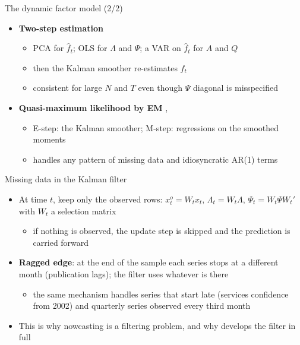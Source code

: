 \begin{frame}{The dynamic factor model (2/2)}
\itemsize{\small}
\begin{itemize}
    \item \textbf{Two-step estimation} 
    \begin{itemize}
        \item PCA for $\hat f_t$; OLS for $\Lambda$ and $\Psi$; a VAR on $\hat f_t$ for $A$ and $Q$
        \item then the Kalman smoother re-estimates $f_t$
        \item consistent for large $N$ and $T$ even though $\Psi$ diagonal is misspecified
    \end{itemize}
    \item \textbf{Quasi-maximum likelihood by EM} , 
    \begin{itemize}
        \item E-step: the Kalman smoother; M-step: regressions on the smoothed moments
        \item handles any pattern of missing data and idiosyncratic AR(1) terms
    \end{itemize}
\end{itemize}
\end{frame}

\begin{frame}{Missing data in the Kalman filter}
\itemsize{\small}
\begin{itemize}
    \item At time $t$, keep only the observed rows: $x_t^o = W_tx_t$, $\Lambda_t = W_t\Lambda$, $\Psi_t = W_t\Psi W_t'$ with $W_t$ a selection matrix
    \begin{itemize}
        \item if nothing is observed, the update step is skipped and the prediction is carried forward
    \end{itemize}
    \item \textbf{Ragged edge}: at the end of the sample each series stops at a different month (publication lags); the filter uses whatever is there
    \begin{itemize}
        \item the same mechanism handles series that start late (services confidence from 2002) and quarterly series observed every third month
    \end{itemize}
    \item This is why nowcasting is a filtering problem, and why  develops the filter in full
\end{itemize}
\end{frame}


